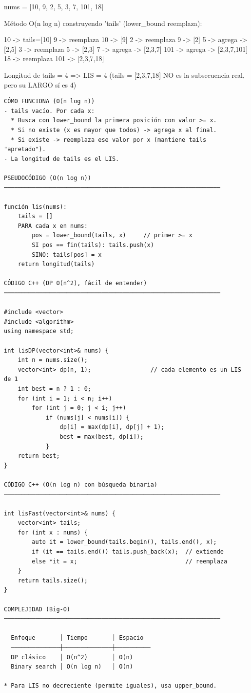 \begin{dsadiagrama}
nums = [10, 9, 2, 5, 3, 7, 101, 18]

Método O(n log n) construyendo 'tails' (lower_bound reemplaza):

  10 -> tails=[10]
   9 -> reemplaza 10   -> [9]
   2 -> reemplaza 9    -> [2]
   5 -> agrega         -> [2,5]
   3 -> reemplaza 5    -> [2,3]
   7 -> agrega         -> [2,3,7]
 101 -> agrega         -> [2,3,7,101]
  18 -> reemplaza 101  -> [2,3,7,18]

Longitud de tails = 4  => LIS = 4
(tails = [2,3,7,18] NO es la subsecuencia real, pero su LARGO sí es 4)
\end{dsadiagrama}

\begin{lstlisting}
CÓMO FUNCIONA (O(n log n))
- tails vacío. Por cada x:
  * Busca con lower_bound la primera posición con valor >= x.
  * Si no existe (x es mayor que todos) -> agrega x al final.
  * Si existe -> reemplaza ese valor por x (mantiene tails "apretado").
- La longitud de tails es el LIS.

PSEUDOCÓDIGO (O(n log n))
──────────────────────────────────────────────────────────────

función lis(nums):
    tails = []
    PARA cada x en nums:
        pos = lower_bound(tails, x)     // primer >= x
        SI pos == fin(tails): tails.push(x)
        SINO: tails[pos] = x
    return longitud(tails)

CÓDIGO C++ (DP O(n^2), fácil de entender)
──────────────────────────────────────────────────────────────

#include <vector>
#include <algorithm>
using namespace std;

int lisDP(vector<int>& nums) {
    int n = nums.size();
    vector<int> dp(n, 1);                 // cada elemento es un LIS de 1
    int best = n ? 1 : 0;
    for (int i = 1; i < n; i++)
        for (int j = 0; j < i; j++)
            if (nums[j] < nums[i]) {
                dp[i] = max(dp[i], dp[j] + 1);
                best = max(best, dp[i]);
            }
    return best;
}

CÓDIGO C++ (O(n log n) con búsqueda binaria)
──────────────────────────────────────────────────────────────

int lisFast(vector<int>& nums) {
    vector<int> tails;
    for (int x : nums) {
        auto it = lower_bound(tails.begin(), tails.end(), x);
        if (it == tails.end()) tails.push_back(x);  // extiende
        else *it = x;                               // reemplaza
    }
    return tails.size();
}

COMPLEJIDAD (Big-O)
──────────────────────────────────────────────────────────────

  Enfoque       │ Tiempo       │ Espacio
  ──────────────┼──────────────┼──────────
  DP clásico    │ O(n^2)       │ O(n)
  Binary search │ O(n log n)   │ O(n)

* Para LIS no decreciente (permite iguales), usa upper_bound.
\end{lstlisting}

